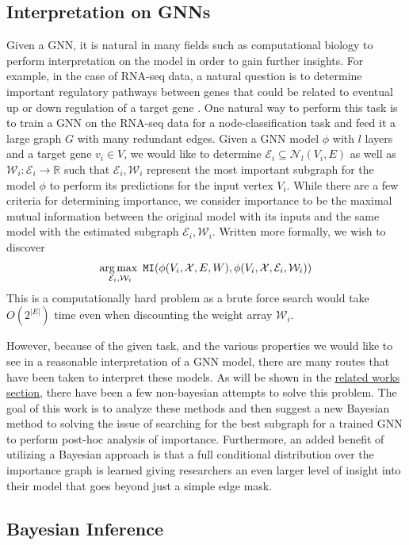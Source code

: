 \subsection{Interpretation on GNNs}
Given a GNN, it is natural in many fields such as computational biology to perform interpretation on the model in order to gain further insights. For example, in the case of RNA-seq data, a natural question is to determine important regulatory pathways between genes that could be related to eventual up or down regulation of a target gene \cite{petralia_new_2016}. One natural way to perform this task is to train a GNN on the RNA-seq data for a node-classification task and feed it a large graph $G$ with many redundant edges. Given a GNN model $\phi$ with $l$ layers and a target gene $v_{i} \in V$, we would like to determine $\mathcal{E}_{i} \subseteq \mathcal{N}_{l}(V_{i}, E)$ as well as $\mathcal{W}_{i} : \mathcal{E}_{i} \rightarrow \mathbb{R}$ such that $\mathcal{E}_{i}, \mathcal{W}_{i}$ represent the most important subgraph for the model $\phi$ to perform its predictions for the input vertex $V_{i}$. While there are a few criteria for determining importance, we consider importance to be the maximal mutual information between the original model with its inputs and the same model with the estimated subgraph $\mathcal{E}_{i}, \mathcal{W}_{i}$. Written more formally, we wish to discover
\begin{align*}
  \operatorname*{arg\,max\,\,}_{\mathcal{E}_{i}, \mathcal{W}_{i}} \mathtt{MI}(\phi(V_{i}, \mathcal{X}, E, W), \phi(V_{i}, \mathcal{X}, \mathcal{E}_{i}, \mathcal{W}_{i}))
\end{align*}
This is a computationally hard problem as a brute force search would take $O(2^{|E|})$ time even when discounting the weight array $\mathcal{W}_{i}$.

However, because of the given task, and the various properties we would like to see in a reasonable interpretation of a GNN model, there are many routes that have been taken to interpret these models. As will be shown in the \hyperref[sec:related]{related works section}, there have been a few non-bayesian attempts to solve this problem. The goal of this work is to analyze these methods and then suggest a new Bayesian method to solving the issue of searching for the best subgraph for a trained GNN to perform post-hoc analysis of importance. Furthermore, an added benefit of utilizing a Bayesian approach is that a full conditional distribution over the importance graph is learned giving researchers an even larger level of insight into their model that goes beyond just a simple edge mask.

\subsection{Bayesian Inference}
